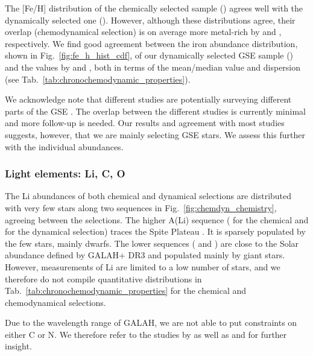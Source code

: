 \documentclass[fleqn,usenatbib]{mnras}
\begin{document}
The [Fe/H] distribution of the chemically selected sample () agrees well with the dynamically selected one (). However, although these distributions agree, their overlap (chemodynamical selection) is on average more metal-rich by  and , respectively. We find good agreement between the iron abundance distribution, shown in Fig.~\ref{fig:fe_h_hist_cdf}, of our dynamically selected GSE sample () and the values by \citet{Naidu2020} and \citet{Feuillet2021}, both in terms of the mean/median value and dispersion (see Tab.~\ref{tab:chronochemodynamic_properties}).

We acknowledge note that different studies are potentially surveying different parts of the GSE \citep[see also the discussion by][]{Bonifacio2021}. The overlap between the different studies is currently minimal and more follow-up is needed. Our results and agreement with most studies suggests, however, that we are mainly selecting GSE stars. We assess this further with the individual abundances.

\subsubsection{Light elements: Li, C, O}

The Li abundances of both chemical and dynamical selections are distributed with very few stars along two sequences in Fig.~\ref{fig:chemdyn_chemistry}, agreeing between the selections. The higher A(Li) sequence ( for the chemical and  for the dynamical selection) traces the Spite Plateau \citep{Spite1982}. It is sparsely populated by the few stars, mainly dwarfs. The lower sequences ( and ) are close to the Solar abundance defined by GALAH+ DR3 \citep{Buder2021} and populated mainly by giant stars. However, measurements of Li are limited to a low number of stars, and we therefore do not compile quantitative distributions in Tab.~\ref{tab:chronochemodynamic_properties} for the chemical and chemodynamical selections. 

Due to the wavelength range of GALAH, we are not able to put constraints on either C or N. We therefore refer to the studies by \citet{Nissen2014} as well as \citet{Hawkins2015} and \citet{Hayes2018} for further insight.
\end{document}
